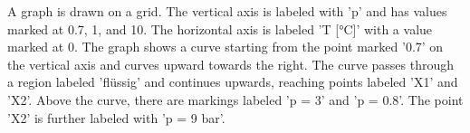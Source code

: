 A graph is drawn on a grid. The vertical axis is labeled with 'p' and has values marked at 0.7, 1, and 10. The horizontal axis is labeled 'T [°C]' with a value marked at 0. The graph shows a curve starting from the point marked '0.7' on the vertical axis and curves upward towards the right. The curve passes through a region labeled 'flüssig' and continues upwards, reaching points labeled 'X1' and 'X2'. Above the curve, there are markings labeled 'p = 3' and 'p = 0.8'. The point 'X2' is further labeled with 'p = 9 bar'.